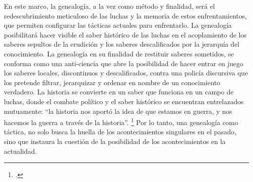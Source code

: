 En este marco, la genealogía, a la vez como método y finalidad, será el redescubrimiento meticuloso de las luchas y la memoria de estos enfrentamientos, que permiten configurar las tácticas actuales para enfrentarlo. La genealogía posibilitará hacer visible el saber histórico de las luchas en el acoplamiento de los saberes sepultos de la erudi­ción y los saberes descalificados por la jerarquía del cono­cimiento. La genealogía en su finalidad de restituir saberes sometidos, se conforma como una anti-ciencia que abre la posibilidad de hacer entrar en juego los saberes locales, discontinuos y descalificados, contra una policía discursiva que los pretende filtrar, jerarquizar y ordenar en nombre de un conocimiento verdadero. La historia se convierte en un saber que funciona en un campo de luchas, donde el combate político y el saber histórico se encuentran entrelazados mutuamente: \enquote{la historia nos aportó la idea de que estamos en guerra, y nos hacemos la guerra a través de la historia}. \footcite[][161]{@7048-FOUCAULT2000} Por lo tanto, una genealogía como táctica, no solo busca la huella de los acontecimientos singulares en el pasado, sino que instaura la cuestión de la posibilidad de los acontecimientos en la actualidad.

